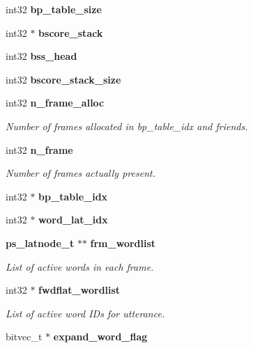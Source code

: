 \begin{DoxyCompactItemize}
\item 
int32 {\bfseries bp\+\_\+table\+\_\+size}\label{structngram__search__s_ae288500a2a3db50d4454546d66c826da}

\item 
int32 $\ast$ {\bfseries bscore\+\_\+stack}\label{structngram__search__s_adbbac268728dae5771cb4400649b62e2}

\item 
int32 {\bfseries bss\+\_\+head}\label{structngram__search__s_aed45eb7f0ed7bbf266a7eb8e4acd22fa}

\item 
int32 {\bfseries bscore\+\_\+stack\+\_\+size}\label{structngram__search__s_a041e34cc7c9dab32d05b00eeb5d6d622}

\item 
int32 {\bf n\+\_\+frame\+\_\+alloc}
\begin{DoxyCompactList}\small\item\em Number of frames allocated in bp\+\_\+table\+\_\+idx and friends. \end{DoxyCompactList}\item 
int32 {\bf n\+\_\+frame}
\begin{DoxyCompactList}\small\item\em Number of frames actually present. \end{DoxyCompactList}\item 
int32 $\ast$ {\bfseries bp\+\_\+table\+\_\+idx}\label{structngram__search__s_ad6c1eda51d21c066ead7d68541546485}

\item 
int32 $\ast$ {\bfseries word\+\_\+lat\+\_\+idx}\label{structngram__search__s_a175cf4fa7cffa91b1966343f5a6f6eaf}

\item 
{\bf ps\+\_\+latnode\+\_\+t} $\ast$$\ast$ {\bf frm\+\_\+wordlist}
\begin{DoxyCompactList}\small\item\em List of active words in each frame. \end{DoxyCompactList}\item 
int32 $\ast$ {\bf fwdflat\+\_\+wordlist}
\begin{DoxyCompactList}\small\item\em List of active word I\+Ds for utterance. \end{DoxyCompactList}\item 
bitvec\+\_\+t $\ast$ {\bfseries expand\+\_\+word\+\_\+flag}\label{structngram__search__s_a1daa869d11179c53eb745da36a654fb3}


\end{DoxyCompactItemize}
